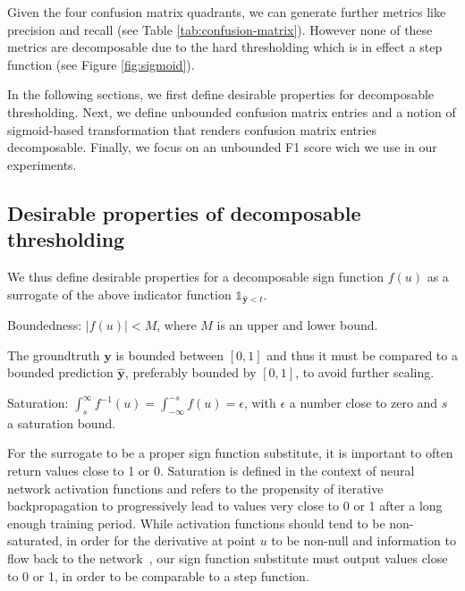 
Given the four confusion matrix quadrants, we can generate further metrics like precision and recall (see Table \ref{tab:confusion-matrix}). However none of these metrics are decomposable due to the hard thresholding which is in effect a step function (see Figure \ref{fig:sigmoid}).

In the following sections, we first define desirable properties for decomposable thresholding.
Next, we define unbounded confusion matrix entries and a notion of sigmoid-based transformation that renders confusion matrix entries decomposable. Finally, we focus on an unbounded F1 score wich we use in our experiments.

\subsection{Desirable properties of decomposable thresholding}

We thus define desirable properties for a decomposable sign function $f(u)$ as a surrogate of the above indicator function \(\mathds{1}_{\hat{\mathbf{y}} < t}\).

\begin{property}
  Boundedness: $|f(u)| < M$, where $M$ is an upper and lower bound.
\end{property}
The groundtruth $\mathbf{y}$ is bounded between $[0,1]$ and thus it must be compared to a bounded prediction $\mathbf{\hat{y}}$, preferably bounded by $[0,1]$, to avoid further scaling.

\begin{property}
  Saturation: $\int_{s}^{\infty} f^{-1}(u) = \int_{-\infty}^{-s} f(u) = \epsilon$, with $\epsilon$ a number close to zero and $s$ a saturation bound.
\end{property}
For the surrogate to be a proper sign function substitute, it is important to often return values close to 1 or 0. Saturation is defined in the context of neural network activation functions and refers to the propensity of iterative backpropagation to progressively lead to values very close to 0 or 1 after a long enough training period. While activation functions should tend to be non-saturated, in order for the derivative at point $u$ to be non-null and information to flow back to the network~\cite{saturation}, our sign function substitute must output values close to 0 or 1, in order to be comparable to a step function.

